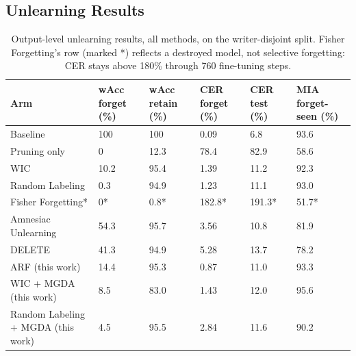\documentclass[a4paper,fleqn]{cas-dc}
\begin{document}
\subsection{Unlearning Results}
\label{sec:unlearn-results}

\begin{table}[t]
\caption{Output-level unlearning results, all methods, on the writer-disjoint split. Fisher Forgetting's row (marked *) reflects a destroyed model, not selective forgetting: CER stays above 180\% through 760 fine-tuning steps.}
\label{tab:unlearn-all}
\begin{tabular*}{\tblwidth}{@{}LLLLLL@{}}
\toprule
Arm & wAcc forget (\%) & wAcc retain (\%) & CER forget (\%) & CER test (\%) & MIA forget-seen (\%) \\
\midrule
Baseline & 100 & 100 & 0.09 & 6.8 & 93.6 \\
Pruning only & 0 & 12.3 & 78.4 & 82.9 & 58.6 \\
WIC & 10.2 & 95.4 & 1.39 & 11.2 & 92.3 \\
Random Labeling & 0.3 & 94.9 & 1.23 & 11.1 & 93.0 \\
Fisher Forgetting* & 0* & 0.8* & 182.8* & 191.3* & 51.7* \\
Amnesiac Unlearning & 54.3 & 95.7 & 3.56 & 10.8 & 81.9 \\
DELETE & 41.3 & 94.9 & 5.28 & 13.7 & 78.2 \\
ARF (this work) & 14.4 & 95.3 & 0.87 & 11.0 & 93.3 \\
WIC + MGDA (this work) & 8.5 & 83.0 & 1.43 & 12.0 & 95.6 \\
Random Labeling + MGDA (this work) & 4.5 & 95.5 & 2.84 & 11.6 & 90.2 \\
\bottomrule
\end{tabular*}
\end{table}
\end{document}

